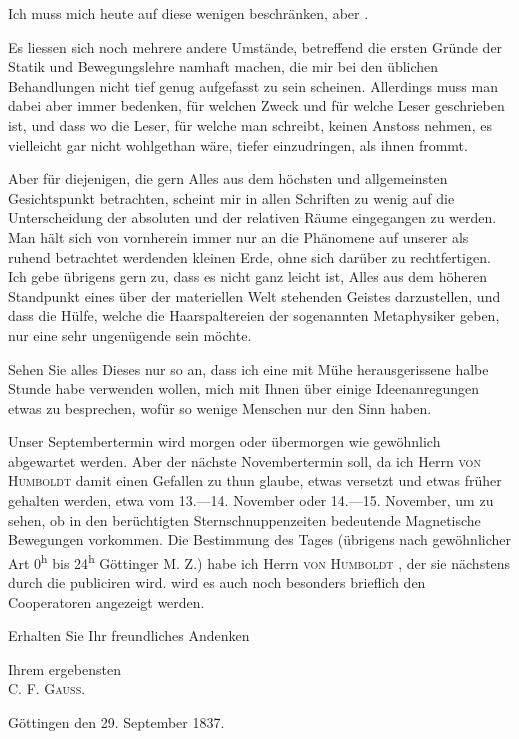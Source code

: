 Ich muss mich heute auf diese wenigen  beschränken, aber
.

Es liessen sich noch mehrere andere Umstände, betreffend die ersten
Gründe der Statik und Bewegungslehre namhaft machen, die mir bei den
üblichen Behandlungen nicht tief genug aufgefasst zu sein scheinen. Allerdings
muss man dabei aber immer bedenken, für welchen Zweck und für
welche Leser geschrieben ist, und dass wo die Leser, für welche man schreibt,
keinen Anstoss nehmen, es vielleicht gar nicht wohlgethan wäre, tiefer einzudringen,
als ihnen frommt.

Aber für diejenigen, die gern Alles aus dem höchsten und allgemeinsten
Gesichtspunkt betrachten, scheint mir in allen Schriften zu wenig auf die
Unterscheidung der absoluten und der relativen Räume eingegangen zu werden.
Man hält sich von vornherein immer nur an die Phänomene auf unserer als
ruhend betrachtet werdenden kleinen Erde, ohne sich darüber zu rechtfertigen.
Ich gebe übrigens gern zu, dass es nicht ganz leicht ist, 
Alles aus dem höheren Standpunkt eines über der materiellen Welt
stehenden Geistes darzustellen, und dass die Hülfe, welche die Haarspaltereien
der sogenannten Metaphysiker geben, nur eine sehr ungenügende sein möchte.

Sehen Sie alles Dieses nur so an, dass ich eine mit Mühe herausgerissene
halbe Stunde habe verwenden wollen, mich mit Ihnen über einige Ideenanregungen
etwas zu besprechen, wofür so wenige Menschen nur den Sinn
haben.

Unser Septembertermin wird morgen oder übermorgen wie gewöhnlich
abgewartet werden. Aber der nächste Novembertermin soll, da ich Herrn
\textsc{von Humboldt} damit einen Gefallen zu thun glaube, etwas versetzt und etwas
früher gehalten werden, etwa vom 13.—14. November oder 14.—15. November,
um zu sehen, ob in den berüchtigten Sternschnuppenzeiten bedeutende Magnetische
Bewegungen vorkommen. Die  Bestimmung des Tages (übrigens
nach gewöhnlicher Art 0\textsuperscript{h} bis 24\textsuperscript{h} Göttinger M. Z.) habe ich Herrn
\textsc{von Humboldt} , der sie nächstens durch die  publiciren
wird.  wird es auch noch besonders brieflich den
Cooperatoren angezeigt werden.
\HistoricalFoot{}{3\textsuperscript{*}}

\clearpage{}
Erhalten Sie Ihr freundliches Andenken
\begin{flushright}Ihrem ergebensten\\C. F. \textsc{Gauss}.\end{flushright}
Göttingen den 29. September 1837.
\par\clearpage\endgroup
